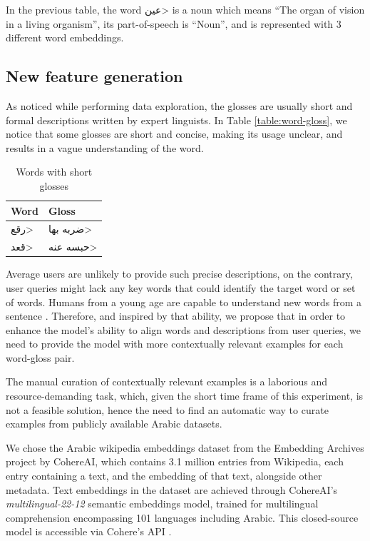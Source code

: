 \documentclass[12.5pt]{article}
\begin{document}
In the previous table, the word \<عين> is a noun which means “The organ of vision in a living organism”, its part-of-speech is “Noun”, and is represented with 3 different word embeddings.

\subsection{New feature generation}

As noticed while performing data exploration, the glosses are usually short and formal descriptions written by expert linguists. In Table \ref{table:word-gloss}, we notice that some glosses are short and concise, making its usage unclear, and results in a vague understanding of the word.

\begin{table}[H]
    \centering
    \caption{Words with short glosses}
    \label{table:word-short-gloss}
    \renewcommand{\arraystretch}{1.5}%
    \begin{tabularx}{\textwidth}{|X|X|}
        \hline
        \textbf{Word} & \textbf{Gloss} \\
        \hline
        \<رقع> & \<ضربه بها> \\
        \hline
        \<قعد> & \<حبسه عنه> \\
        \hline
    \end{tabularx}
\end{table}

Average users are unlikely to provide such precise descriptions, on the contrary, user queries might lack any key words that could identify the target word or set of words. Humans from a young age are capable to understand new words from a sentence \cite{killian1995}. Therefore, and inspired by that ability, we propose that in order to enhance the model’s ability to align words and descriptions from user queries, we need to provide the model with more contextually relevant examples for each word-gloss pair.

The manual curation of contextually relevant examples is a laborious and resource-demanding task, which, given the short time frame of this experiment, is not a feasible solution, hence the need to find an automatic way to curate examples from publicly available Arabic datasets.

We chose the Arabic wikipedia embeddings dataset from the Embedding Archives project by CohereAI, which contains 3.1 million entries from Wikipedia, each entry containing a text, and the embedding of that text, alongside other metadata. Text embeddings in the dataset are achieved through CohereAI's \textit{multilingual-22-12} semantic embeddings model, trained for multilingual comprehension encompassing 101 languages including Arabic. This closed-source model is accessible via Cohere's API \cite{Kamalloo2023}.
\end{document}
